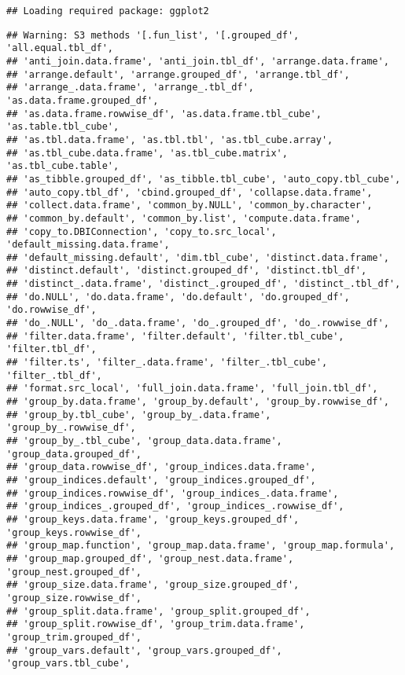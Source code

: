 \documentclass[]{article}
\begin{document}
\begin{verbatim}
## Loading required package: ggplot2
\end{verbatim}

\begin{verbatim}
## Warning: S3 methods '[.fun_list', '[.grouped_df', 'all.equal.tbl_df',
## 'anti_join.data.frame', 'anti_join.tbl_df', 'arrange.data.frame',
## 'arrange.default', 'arrange.grouped_df', 'arrange.tbl_df',
## 'arrange_.data.frame', 'arrange_.tbl_df', 'as.data.frame.grouped_df',
## 'as.data.frame.rowwise_df', 'as.data.frame.tbl_cube', 'as.table.tbl_cube',
## 'as.tbl.data.frame', 'as.tbl.tbl', 'as.tbl_cube.array',
## 'as.tbl_cube.data.frame', 'as.tbl_cube.matrix', 'as.tbl_cube.table',
## 'as_tibble.grouped_df', 'as_tibble.tbl_cube', 'auto_copy.tbl_cube',
## 'auto_copy.tbl_df', 'cbind.grouped_df', 'collapse.data.frame',
## 'collect.data.frame', 'common_by.NULL', 'common_by.character',
## 'common_by.default', 'common_by.list', 'compute.data.frame',
## 'copy_to.DBIConnection', 'copy_to.src_local', 'default_missing.data.frame',
## 'default_missing.default', 'dim.tbl_cube', 'distinct.data.frame',
## 'distinct.default', 'distinct.grouped_df', 'distinct.tbl_df',
## 'distinct_.data.frame', 'distinct_.grouped_df', 'distinct_.tbl_df',
## 'do.NULL', 'do.data.frame', 'do.default', 'do.grouped_df', 'do.rowwise_df',
## 'do_.NULL', 'do_.data.frame', 'do_.grouped_df', 'do_.rowwise_df',
## 'filter.data.frame', 'filter.default', 'filter.tbl_cube', 'filter.tbl_df',
## 'filter.ts', 'filter_.data.frame', 'filter_.tbl_cube', 'filter_.tbl_df',
## 'format.src_local', 'full_join.data.frame', 'full_join.tbl_df',
## 'group_by.data.frame', 'group_by.default', 'group_by.rowwise_df',
## 'group_by.tbl_cube', 'group_by_.data.frame', 'group_by_.rowwise_df',
## 'group_by_.tbl_cube', 'group_data.data.frame', 'group_data.grouped_df',
## 'group_data.rowwise_df', 'group_indices.data.frame',
## 'group_indices.default', 'group_indices.grouped_df',
## 'group_indices.rowwise_df', 'group_indices_.data.frame',
## 'group_indices_.grouped_df', 'group_indices_.rowwise_df',
## 'group_keys.data.frame', 'group_keys.grouped_df', 'group_keys.rowwise_df',
## 'group_map.function', 'group_map.data.frame', 'group_map.formula',
## 'group_map.grouped_df', 'group_nest.data.frame', 'group_nest.grouped_df',
## 'group_size.data.frame', 'group_size.grouped_df', 'group_size.rowwise_df',
## 'group_split.data.frame', 'group_split.grouped_df',
## 'group_split.rowwise_df', 'group_trim.data.frame', 'group_trim.grouped_df',
## 'group_vars.default', 'group_vars.grouped_df', 'group_vars.tbl_cube',

\end{verbatim}
\end{document}
